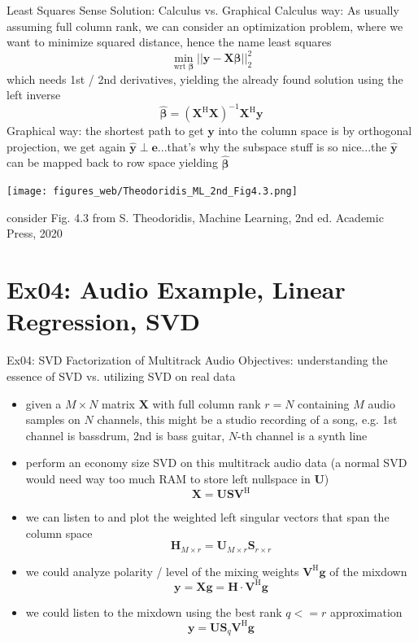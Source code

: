 \documentclass[mathserif, aspectratio=1610]{intbeamer}
\begin{document}
\begin{frame}{Least Squares Sense Solution: Calculus vs. Graphical}
Calculus way: As usually assuming full column rank, we can consider an optimization problem, where we want to minimize
squared distance, hence the name least squares
$$\min_{\text{wrt }\bm{\beta}} ||\bm{y} - \bm{X} \bm{\beta}||_2^2$$
which needs 1st / 2nd derivatives, yielding the already found solution using the left inverse
$$\hat{\bm{\beta}} = (\bm{X}^\mathrm{H}\bm{X})^{-1} \bm{X}^\mathrm{H} \bm{y}$$
Graphical way: the shortest path to get $\bm{y}$ into the column space is by orthogonal projection, we get again $\hat{\bm{y}} \perp \bm{e}$...that's why the subspace
stuff is so nice...the $\hat{\bm{y}}$ can be mapped back to row space yielding $\hat{\bm{\beta}}$
\begin{center}
\texttt{[image: figures\_web/Theodoridis\_ML\_2nd\_Fig4.3.png]}
\end{center}
\begin{footnotesize}consider Fig. 4.3 from S. Theodoridis, Machine Learning, 2nd ed. Academic Press, 2020\end{footnotesize}
\end{frame}

\section{Ex04: Audio Example, Linear Regression, SVD}
\begin{frame}{Ex04: SVD Factorization of Multitrack Audio}
Objectives: understanding the essence of SVD vs. utilizing SVD on real data

\begin{itemize}
\item given a $M \times N$ matrix $\bm{X}$ with full column rank $r=N$ containing $M$ audio samples on $N$ channels, this might be a studio recording of a song, e.g. 1st channel is bassdrum, 2nd is bass guitar, $N$-th channel is a synth line
\item perform an economy size SVD on this multitrack audio data (a normal SVD would need way too much RAM to store left nullspace in $\bm{U}$)
$$\bm{X} = \bm{U} \bm{S} \bm{V}^\mathrm{H}$$
\item we can listen to and plot the weighted left singular vectors that span the column space
$$\mathbf{H}_{M \times r} =  \mathbf{U}_{M \times r} \mathbf{S}_{r \times r}$$
\item we could analyze polarity / level of the mixing weights $\mathbf{V}^\mathrm{H} \mathbf{g}$ of the mixdown
$$\mathbf{y} = \mathbf{X}\mathbf{g} = \mathbf{H} \cdot \mathbf{V}^\mathrm{H} \mathbf{g}$$
\item we could listen to the mixdown using the best rank $q<=r$ approximation
$$\mathbf{y} =\bm{U} \bm{S}_q \bm{V}^\mathrm{H}\mathbf{g}$$
\end{itemize}

\end{frame}
\end{document}
